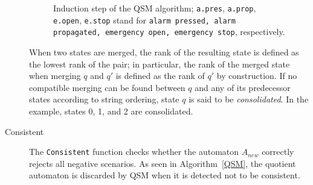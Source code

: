 \begin{description}
\begin{figure}[H]
\centering
{}
\caption[Induction step of the \textsc{QSM} algorithm]{Induction step of the \textsc{QSM} algorithm; \texttt{a.pres}, \texttt{a.prop}, \texttt{e.open}, \texttt{e.stop} stand for \texttt{alarm pressed, alarm propagated, emergency open, emergency stop}, respectively.\label{Fig:algo:steps}}
\end{figure}

When two states are merged, the rank of the resulting state is defined as the lowest rank of the pair; in particular, the rank of the merged state when merging $q$ and $q'$ is defined as the rank of $q'$ by construction. If no compatible merging can be found between $q$ and any of its predecessor states according to string ordering, state $q$ is said to be \textsl{consolidated}. In the example, states 0, 1, and 2 are consolidated.

\item[Consistent] The \texttt{Consistent} function checks whether the automaton $A_{new}$ correctly rejects all negative scenarios. As seen in Algorithm~\ref{QSM}, the quotient automaton is discarded by \textsc{QSM} when it is detected not to be consistent.

\end{description}

